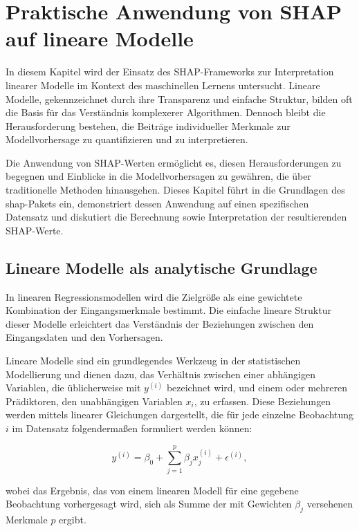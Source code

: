 \chapter{Praktische Anwendung von SHAP auf lineare Modelle}

In diesem Kapitel wird der Einsatz des SHAP-Frameworks zur Interpretation linearer Modelle im 
Kontext des maschinellen Lernens untersucht. Lineare Modelle, gekennzeichnet durch ihre Transparenz 
und einfache Struktur, bilden oft die Basis für das Verständnis komplexerer Algorithmen. 
Dennoch bleibt die Herausforderung bestehen, die Beiträge individueller Merkmale zur Modellvorhersage zu 
quantifizieren und zu interpretieren.

Die Anwendung von SHAP-Werten ermöglicht es, diesen Herausforderungen zu begegnen und Einblicke in 
die Modellvorhersagen zu gewähren, die über traditionelle Methoden hinausgehen. 
Dieses Kapitel führt in die Grundlagen des \textsf{shap}-Pakets ein, demonstriert dessen Anwendung auf einen 
spezifischen Datensatz und diskutiert die Berechnung sowie Interpretation der resultierenden SHAP-Werte. 

\section{Lineare Modelle als analytische Grundlage}

In linearen Regressionsmodellen wird die Zielgröße als eine gewichtete Kombination der Eingangsmerkmale bestimmt. 
Die einfache lineare Struktur dieser Modelle erleichtert das Verständnis der Beziehungen zwischen den Eingangsdaten 
und den Vorhersagen. 

Lineare Modelle sind ein grundlegendes Werkzeug in der statistischen Modellierung und dienen dazu, das Verhältnis zwischen 
einer abhängigen Variablen, die üblicherweise mit $y^{(i)}$ bezeichnet wird, 
und einem oder mehreren Prädiktoren, den unabhängigen Variablen $x_i$, zu erfassen. 
Diese Beziehungen werden mittels linearer Gleichungen dargestellt, die für jede 
einzelne Beobachtung $i$ im Datensatz folgendermaßen formuliert werden können:

\begin{equation}
    y^{(i)} = \beta_0 + \sum_{j=1}^{p} \beta_j x^{(i)}_j + \epsilon^{(i)},
\label{eq:reg-model}
\end{equation}

wobei das Ergebnis, das von einem linearen Modell für eine gegebene Beobachtung vorhergesagt wird, sich als Summe der mit 
Gewichten $\beta_j$ versehenen Merkmale $p$ ergibt.

